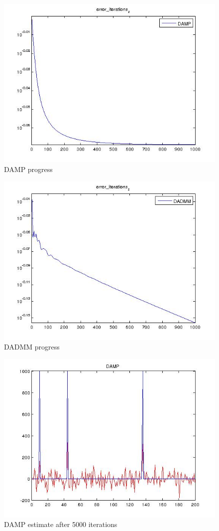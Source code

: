 \documentclass{article}
\begin{document}
\begin{figure}[h]
\centering
\includegraphics[height = 7.3 cm]{DAMP1000.jpg}
\caption{DAMP progress}
\label{fig:hvb}
\end{figure}

\begin{figure}[h]
\centering
\includegraphics[height = 7.3 cm]{DADMM1000.jpg}
\caption{DADMM progress}
\label{fig:hvb}
\end{figure}

\begin{figure}[h]
\centering
\includegraphics[height = 7.3 cm]{DAMPxhat5000.jpg}
\caption{DAMP estimate after 5000 iterations}
\label{fig:hvb}
\end{figure}
\end{document}
